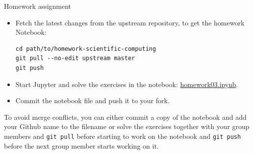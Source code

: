 \begin{frame}[fragile]{Homework assignment}
	\begin{itemize}
		\item Fetch the latest changes from the upstream repository, to get the homework Notebook:
            {\scriptsize
            \begin{verbatim}
cd path/to/homework-scientific-computing
git pull --no-edit upstream master
git push\end{verbatim}
            }
        \item Start Jupyter and solve the exercises in the notebook:
            \href{https://github.com/inwe-boku/homework-scientific-computing/blob/master/homework03-python-introduction/homework03.ipynb}{homework03.ipynb}.
        \item Commit the notebook file and push it to your fork.
	\end{itemize}

    \bigskip
    To avoid merge conflicts, you can either commit a copy of the notebook and add your Github name
    to the filename or solve the exercises together with your group members and \verb|git pull|
    before starting to work on the notebook and \verb|git push| before the next group member starts
    working on it.
\end{frame}


